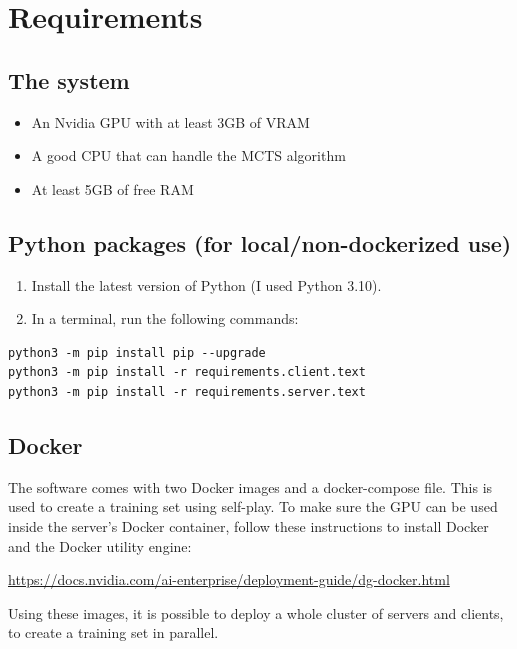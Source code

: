 \documentclass{article}
\begin{document}
\section{Requirements}

\subsection{The system}

\begin{itemize}
	\item An Nvidia GPU with at least 3GB of VRAM
	\item A good CPU that can handle the MCTS algorithm
	\item At least 5GB of free RAM
\end{itemize}

\subsection{Python packages (for local/non-dockerized use)}

\begin{enumerate}
	\item Install the latest version of Python (I used Python 3.10). 
	\item In a terminal, run the following commands:
\end{enumerate}

\begin{verbatim}
python3 -m pip install pip --upgrade
python3 -m pip install -r requirements.client.text
python3 -m pip install -r requirements.server.text
\end{verbatim}

\subsection{Docker}

The software comes with two Docker images and a docker-compose file.
This is used to create a training set using self-play. 
To make sure the GPU can be used inside the server's Docker container,
follow these instructions to install Docker and the Docker utility engine:

\url{https://docs.nvidia.com/ai-enterprise/deployment-guide/dg-docker.html}

Using these images, it is possible to deploy a whole cluster of servers and clients,
to create a training set in parallel.
\end{document}
